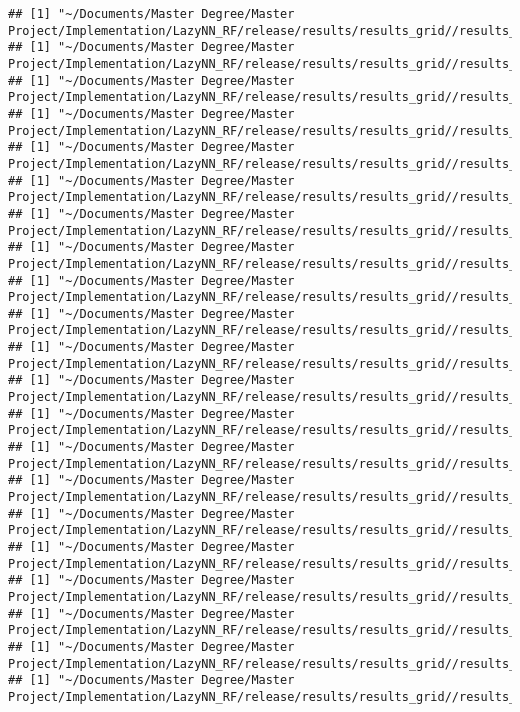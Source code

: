 \documentclass[]{article}
\begin{document}
\begin{verbatim}
## [1] "~/Documents/Master Degree/Master Project/Implementation/LazyNN_RF/release/results/results_grid//results_bert_20ng"
## [1] "~/Documents/Master Degree/Master Project/Implementation/LazyNN_RF/release/results/results_grid//results_bert_4uni"
## [1] "~/Documents/Master Degree/Master Project/Implementation/LazyNN_RF/release/results/results_grid//results_bert_acm"
## [1] "~/Documents/Master Degree/Master Project/Implementation/LazyNN_RF/release/results/results_grid//results_bert_reuters90"
## [1] "~/Documents/Master Degree/Master Project/Implementation/LazyNN_RF/release/results/results_grid//results_broof_20ng"
## [1] "~/Documents/Master Degree/Master Project/Implementation/LazyNN_RF/release/results/results_grid//results_broof_4uni"
## [1] "~/Documents/Master Degree/Master Project/Implementation/LazyNN_RF/release/results/results_grid//results_broof_acm"
## [1] "~/Documents/Master Degree/Master Project/Implementation/LazyNN_RF/release/results/results_grid//results_broof_reuters90"
## [1] "~/Documents/Master Degree/Master Project/Implementation/LazyNN_RF/release/results/results_grid//results_knn_20ng"
## [1] "~/Documents/Master Degree/Master Project/Implementation/LazyNN_RF/release/results/results_grid//results_knn_4uni"
## [1] "~/Documents/Master Degree/Master Project/Implementation/LazyNN_RF/release/results/results_grid//results_knn_acm"
## [1] "~/Documents/Master Degree/Master Project/Implementation/LazyNN_RF/release/results/results_grid//results_knn_reuters90"
## [1] "~/Documents/Master Degree/Master Project/Implementation/LazyNN_RF/release/results/results_grid//results_lazy_20ng"
## [1] "~/Documents/Master Degree/Master Project/Implementation/LazyNN_RF/release/results/results_grid//results_lazy_4uni"
## [1] "~/Documents/Master Degree/Master Project/Implementation/LazyNN_RF/release/results/results_grid//results_lazy_acm"
## [1] "~/Documents/Master Degree/Master Project/Implementation/LazyNN_RF/release/results/results_grid//results_lazy_reuters90"
## [1] "~/Documents/Master Degree/Master Project/Implementation/LazyNN_RF/release/results/results_grid//results_lxt_20ng"
## [1] "~/Documents/Master Degree/Master Project/Implementation/LazyNN_RF/release/results/results_grid//results_lxt_4uni"
## [1] "~/Documents/Master Degree/Master Project/Implementation/LazyNN_RF/release/results/results_grid//results_lxt_acm"
## [1] "~/Documents/Master Degree/Master Project/Implementation/LazyNN_RF/release/results/results_grid//results_lxt_reuters90"
## [1] "~/Documents/Master Degree/Master Project/Implementation/LazyNN_RF/release/results/results_grid//results_nb_20ng"

\end{verbatim}
\end{document}
